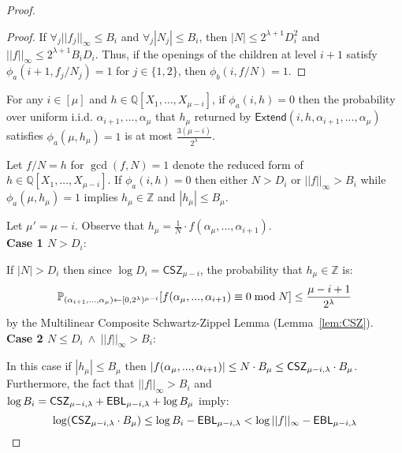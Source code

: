 \begin{proof}
\begin{proof}
If $\forall _j ||f_j||_\infty \leq B_i$ and $\forall_j |N_j| \leq B_i$,  then $|N|  \leq 2^{\lambda + 1} D_i^2$ and $||f||_\infty \leq 2^{\lambda + 1} B_i D_i$. Thus, if the openings of the children at level $i+1$ satisfy $\phi_a(i+1, f_j/N_j) = 1$ for $j \in \{1, 2\}$, then $\phi_b(i, f/N) = 1$. %
\end{proof} 



\begin{subclaim} 
For any $i \in [\mu]$ and $h \in \mathbb{Q}[X_1,\dots,X_{\mu-i}]$, if $\phi_a(i, h) = 0$ then the probability over uniform i.i.d. $\alpha_{i+1},...,\alpha_\mu$ that $h_\mu$ returned by $\textsf{Extend}(i,h, \alpha_{i+1},...,\alpha_\mu)$ satisfies $\phi_a(\mu, h_\mu) = 1$ is at most $\frac{3(\mu - i)}{2^\lambda}$. 
\end{subclaim} 

Let $f/N = h$ for $\gcd(f, N) = 1$ denote the reduced form of $h \in \mathbb{Q}[X_1,\dots,X_{\mu-i}]$. If $\phi_a(i,h) = 0$ then either $N > D_i$ or $||f||_\infty > B_i$ while $\phi_a(\mu, h_\mu) = 1$ implies $h_\mu \in \mathbb{Z}$ and $|h_\mu| \leq B_\mu$.

 Let $\mu' = \mu - i$. Observe that $h_\mu = \frac{1}{N} \cdot f(\alpha_{\mu},...,\alpha_{i+1})$. \\
 
 \noindent \textbf{Case 1 $N > D_i$}: 
 
 If $|N| > D_i$ then since $\log D_i = \mathsf{CSZ}_{\mu - i}$, the probability that $h_\mu \in \mathbb{Z}$ is:
 $$\Prob_{(\alpha_{i+1},...,\alpha_\mu) \gets [0,2^\lambda)^{\mu -i}} [f(\alpha_{\mu},...,\alpha_{i+1})\equiv 0 \bmod N]  \leq \frac{\mu - i +1}{2^\lambda}$$
by the Multilinear Composite Schwartz-Zippel Lemma (Lemma~\ref{lem:CSZ}).\\

 
\noindent \textbf{Case 2 $N \leq D_i \ \wedge \ ||f||_\infty > B_i$}: 
 
In this case if $|h_\mu| \leq B_\mu$ then $|f(\alpha_{\mu},...,\alpha_{i+1})| \leq N \cdot B_\mu \leq \CSZ[\mu - i] \cdot B_\mu$. 
 Furthermore, the fact that $||f||_\infty > B_i$ and $\log B_i = \CSZ[\mu - i] + \EBL[\mu - i] + \log B_\mu$ imply: 
 $$\log (\CSZ[\mu -i] \cdot B_\mu) \leq \log B_i - \EBL[\mu - i ] < \log ||f||_\infty - \EBL[\mu - i]$$
 

\end{proof}

